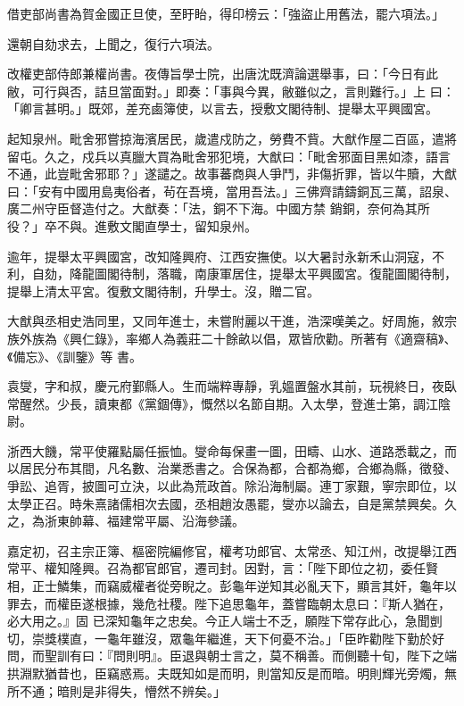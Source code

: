 \begin{pinyinscope}
 借吏部尚書為賀金國正旦使，至盱眙，得印榜云：「強盜止用舊法，罷六項法。」



 還朝自劾求去，上聞之，復行六項法。



 改權吏部侍郎兼權尚書。夜傳旨學士院，出唐沈既濟論選舉事，曰：「今日有此敝，可行與否，詰旦當面對。」即奏：「事與今異，敝雖似之，言則難行。」上
 曰：「卿言甚明。」既郊，差充鹵簿使，以言去，授敷文閣待制、提舉太平興國宮。



 起知泉州。毗舍邪嘗掠海濱居民，歲遣戍防之，勞費不貲。大猷作屋二百區，遣將留屯。久之，戍兵以真臘大買為毗舍邪犯境，大猷曰：「毗舍邪面目黑如漆，語言不通，此豈毗舍邪耶？」遂譴之。故事蕃商與人爭鬥，非傷折罪，皆以牛贖，大猷曰：「安有中國用島夷俗者，茍在吾境，當用吾法。」三佛齊請鑄銅瓦三萬，詔泉、廣二州守臣督造付之。大猷奏：「法，銅不下海。中國方禁
 銷銅，奈何為其所役？」卒不與。進敷文閣直學士，留知泉州。



 逾年，提舉太平興國宮，改知隆興府、江西安撫使。以大暑討永新禾山洞寇，不利，自劾，降龍圖閣待制，落職，南康軍居住，提舉太平興國宮。復龍圖閣待制，提舉上清太平宮。復敷文閣待制，升學士。沒，贈二官。



 大猷與丞相史浩同里，又同年進士，未嘗附麗以干進，浩深嘆美之。好周施，敘宗族外族為《興仁錄》，率鄉人為義莊二十餘畝以倡，眾皆欣勸。所著有《適齋稿》、《備忘》、《訓鑒》等
 書。



 袁燮，字和叔，慶元府鄞縣人。生而端粹專靜，乳媼置盤水其前，玩視終日，夜臥常醒然。少長，讀東都《黨錮傳》，慨然以名節自期。入太學，登進士第，調江陰尉。



 浙西大饑，常平使羅點屬任振恤。燮命每保畫一圖，田疇、山水、道路悉載之，而以居民分布其間，凡名數、治業悉書之。合保為都，合都為鄉，合鄉為縣，徵發、爭訟、追胥，披圖可立決，以此為荒政首。除沿海制屬。連丁家艱，寧宗即位，以
 太學正召。時朱熹諸儒相次去國，丞相趙汝愚罷，燮亦以論去，自是黨禁興矣。久之，為浙東帥幕、福建常平屬、沿海參議。



 嘉定初，召主宗正簿、樞密院編修官，權考功郎官、太常丞、知江州，改提舉江西常平、權知隆興。召為都官郎官，遷司封。因對，言：「陛下即位之初，委任賢相，正士鱗集，而竊威權者從旁睨之。彭龜年逆知其必亂天下，顯言其奸，龜年以罪去，而權臣遂根據，幾危社稷。陛下追思龜年，蓋嘗臨朝太息曰：『斯人猶在，必大用之。』固
 已深知龜年之忠矣。今正人端士不乏，願陛下常存此心，急聞剴切，崇獎樸直，一龜年雖沒，眾龜年繼進，天下何憂不治。」「臣昨勸陛下勤於好問，而聖訓有曰：『問則明』。臣退與朝士言之，莫不稱善。而側聽十旬，陛下之端拱淵默猶昔也，臣竊惑焉。夫既知如是而明，則當知反是而暗。明則輝光旁燭，無所不通；暗則是非得失，懵然不辨矣。」




\end{pinyinscope}
